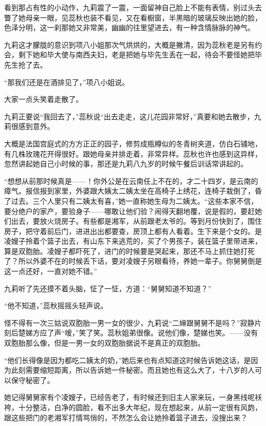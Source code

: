\par 看到那占有性的小动作，九莉震了一震，一面留神自己脸上不能有表情，别过头去瞥了她母亲一眼，见蕊秋也装不看见，又在看橱窗，半黑暗的玻璃反映出她的脸，色泽分明，这一刹那她又非常美，幽幽的往里望进去，有一种含情脉脉的神气。
\par 九莉这才朦胧的意识到项八小姐那次气烘烘的，大概是撇清，因为蕊秋老是另有约会，剩下她和毕大使与南西夫妇，老是把她与毕先生丢在一起，待会不要怪她把毕先生抢了去。
\par “那我们还是在酒排见了，”项八小姐说。
\par 大家一点头笑着走散了。
\par 九莉正要说“我回去了，”蕊秋说“出去走走，这儿花园非常好，”真要和她去散步，九莉很感到意外。
\par 大概是法国宫庭式的方方正正的园子，修剪成瓶樽似的冬青树夹道，仿白石铺地，有几株玫瑰花开得很好。跟她母亲并排走着，非常异样。蕊秋也许也感到这异样，忽然讲起她自己小时候的事，那还是九莉八九岁的时候午餐后训话常讲起的。
\par “想想从前那时候真是——！你外公是在云南任上不在的，才二十四岁，是云南的瘴气。报信报到家里，外婆跟大姨太二姨太坐在高椅子上绣花，连椅子栽倒了，昏了过去。三个人里只有二姨太有喜，”她一直称她生母为二姨太。“这些本家不信，要分绝户的家产，要验身子——哪敢让他们验？闹得天翻地覆，说是假的，要赶她们出去，要放火烧房子。有些都是湘军，从前跟老太爷的。等到月份快到了，围住房子，把守着前后门，进进出出都要查，房顶上都有人看着。生下来是个女的。是凌嫂子拎着个篮子出去，有山东下来逃荒的，买了个男孩子，装在篮子里带进来，算是双胞胎。凌嫂子都吓死了，进门的时候要是哭起来，那还不马上抓住她打死了？所以外婆不在的时候丢下话，要对凌嫂子另眼看待，养她一辈子。你舅舅倒是这一点还好，一直对她不错。”
\par 九莉听了先还摸不着头脑，怔了一怔，方道：“舅舅知道不知道？”
\par “他不知道，”蕊秋摇摇头轻声说。
\par 怪不得有一次三姑说双胞胎一男一女的很少，九莉说“二婶跟舅舅不是吗？”寂静片刻后楚娣方应了声“嗳，”笑了笑。蕊秋姐弟很像。说他们像，楚娣也笑。——没有双胞胎那么像，但是一男一女的双胞胎据说不是真正的双胞胎。
\par “他们长得像是因为都吃二姨太的奶，”她后来也有点知道这时候告诉她这话，是因为此刻需要缩短距离，所以告诉她一件秘密。而且她也有这么大了，十八岁的人可以保守秘密了。
\par 她记得舅舅家有个凌嫂子，已经告老了，有时候还到旧主人家来玩，一身黑线呢袄袴，十分整洁，白净的圆脸，看不出多大年纪，现在想起来，从前一定很有风韵，跟这些把门的老湘军打情骂俏的，不然怎么会让她拎着篮子进去，没搜出来？
